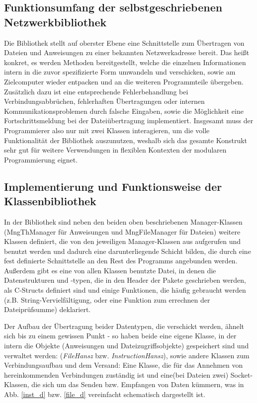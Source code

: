 \subsection{Funktionsumfang der selbstgeschriebenen Netzwerkbibliothek}
Die Bibliothek stellt auf oberster Ebene eine Schnittstelle zum Übertragen von Dateien und Anweisungen zu einer bekannten Netzwerkadresse bereit.
Das heißt konkret, es werden Methoden bereitgestellt, welche die einzelnen Informationen intern in die zuvor spezifizierte Form umwandeln und verschicken, sowie am Zielcomputer wieder entpacken und an die weiteren Programmteile übergeben.
Zusätzlich dazu ist eine entsprechende Fehlerbehandlung bei Verbindungsabbrüchen, fehlerhaften Übertragungen oder internen Kommunikationsproblemen durch falsche Eingaben, sowie die Möglichkeit eine Fortschrittsmeldung bei der Dateiübertragung implementiert.
Insgesamt muss der Programmierer also nur mit zwei Klassen interagieren, um die volle Funktionalität der Bibliothek auszunutzen, weshalb sich das gesamte Konstrukt sehr gut für weitere Verwendungen in flexiblen Kontexten der modularen Programmierung eignet.

\subsection{Implementierung und Funktionsweise der Klassenbibliothek}
In der Bibliothek sind neben den beiden oben beschriebenen Manager-Klassen (MngThManager für Anweisungen und MngFileManager für Dateien) weitere Klassen definiert, die von den jeweiligen Manager-Klassen aus aufgerufen und benutzt werden und dadurch eine darunterliegende Schicht bilden, die durch eine fest definierte Schnittstelle an den Rest des Programms angebunden werden.
Außerdem gibt es eine von allen Klassen benutzte Datei, in denen die Datenstrukturen und -typen, die in den Header der Pakete geschrieben werden, als C-Structs definiert sind und einige Funktionen, die häufig gebraucht werden (z.B. String-Vervielfältigung, oder eine Funktion zum errechnen der Dateiprüfsumme) deklariert.\par
Der Aufbau der Übertragung beider Datentypen, die verschickt werden, ähnelt sich bis zu einem gewissen Punkt - so haben beide eine eigene Klasse, in der intern die Objekte (Anweisungen und Dateizugriffsobjekte) gespeichert sind und verwaltet werden: (\textit{FileHansz} bzw. \textit{InstructionHansz}), sowie andere Klassen zum Verbindungsaufbau und dem Versand: Eine Klasse, die für das Annehmen von hereinkommenden Verbindungen zuständig ist und eine(bei Dateien zwei) Socket-Klassen, die sich um das Senden bzw. Empfangen von Daten kümmern, was in Abb. \ref{inst_d} bzw. \ref{file_d} vereinfacht schematisch dargestellt ist.\\

